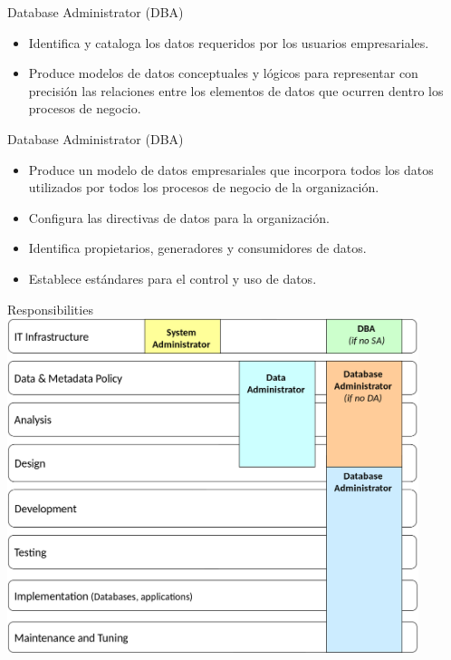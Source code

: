 \documentclass{beamer}
\begin{document}
\begin{frame}{Database Administrator (DBA)}
    \begin{itemize}
        \item Identifica y cataloga los datos requeridos por los usuarios empresariales.
        \item Produce modelos de datos conceptuales y lógicos para representar con precisión las relaciones entre los elementos de datos que ocurren dentro los procesos de negocio.
    \end{itemize}
\end{frame}

\begin{frame}{Database Administrator (DBA)}
    \begin{itemize}
        \item Produce un modelo de datos empresariales que incorpora todos los datos utilizados por todos los procesos de negocio de la organización.
        \item Configura las directivas de datos para la organización.
        \item Identifica propietarios, generadores y consumidores de datos.
        \item Establece estándares para el control y uso de datos.
    \end{itemize}
\end{frame}

\begin{frame}{Responsibilities}
    \centering
    \includegraphics[width=0.9\textwidth]{figures/responsibilities.png}
\end{frame}
\end{document}
